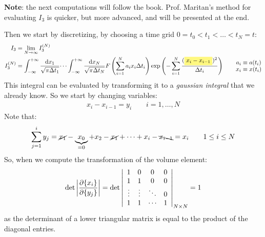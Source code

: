 \documentclass[../template.tex]{subfiles}
\begin{document}
\begin{expl}
    \textbf{Note}: the next computations will follow the book. Prof. Maritan's method for evaluating $I_3$ is quicker, but more advanced, and will be presented at the end.  
\end{expl}
Then we start by discretizing, by choosing a time grid $0 = t_0 < t_1 < \dots < t_N = t$:
\begin{align*}
    I_3 &= \lim_{N \to \infty} I_3^{(N)}\\
    I_3^{(N)} &= \int_{-\infty}^{+\infty} \frac{\dd{x_1}}{\sqrt{\pi \Delta t_1}} \dots \int_{-\infty}^{+\infty} \frac{\dd{x_N}}{\sqrt{ \pi \Delta t_N }}  F\left(\sum_{i=1}^N a_i x_i \Delta t_i\right) \exp\left(-\sum_{i=1}^N \frac{(\hlc{Yellow}{x_i - x_{i-1}})^2}{\Delta t_i} \right) \qquad
\substack{\displaystyle a_i \equiv a(t_i)\\\displaystyle x_i \equiv x(t_i)}
\end{align*}
This integral can be evaluated by transforming it to a \textit{gaussian integral} that we already know. So we start by changing variables:
\begin{align}
    x_i - x_{i-1} = y_i \qquad i=1,\dots,N \label{eqn:first-cov}
\end{align}
Note that:
\begin{align*}
    \sum_{j=1}^i y_j = \cancel{x_1} - \underbrace{x_0}_{=0}  + x_2 - \cancel{x_1} + \dots + x_i - \bcancel{x_{i-1}} = x_i \qquad 1 \leq i \leq N
\end{align*}
So, when we compute the transformation of the volume element:
\begin{align*}
    \operatorname{det}\left|\pdv{\{x_i\}}{\{y_j\}}\right| = \operatorname{det} \left|\begin{array}{cccc}
    1 & 0 & 0 & 0 \\ 
    1 & 1 & 0 & 0 \\ 
    \vdots & \vdots & \ddots & 0 \\ 
    1 & 1 & \cdots & 1
    \end{array}\right|_{N\times N} = 1
\end{align*}
as the determinant of a lower triangular matrix is equal to the product of the diagonal entries.
\end{document}

